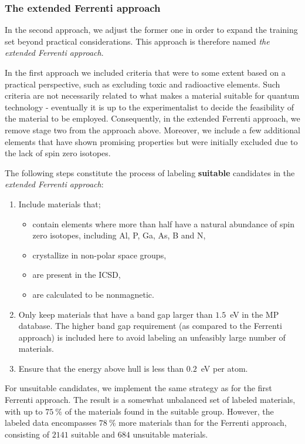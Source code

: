 \documentclass[superscriptaddress,unsortedaddress,
 amsmath,amssymb,
 aps,
]{revtex4-2}
\begin{document}
\subsubsection*{The extended Ferrenti approach}
In the second approach, we adjust the former one in order to expand the training set beyond practical considerations. This approach is therefore named \emph{the extended Ferrenti approach}. 

In the first approach we included criteria that were 
to some extent based on a practical perspective, such as excluding toxic and radioactive elements. Such criteria are not necessarily related to what makes a material suitable for quantum technology - eventually it is up to the experimentalist to decide the feasibility of the material to be employed. 
Consequently, in the extended Ferrenti approach, we remove stage two from the approach above. Moreover, we include a few additional elements that have shown promising properties but were initially excluded due to the lack of spin zero isotopes. 

The following steps constitute the process of labeling \textbf{suitable} candidates in the \emph{extended Ferrenti approach}:
\begin{enumerate}
    \item Include materials that; 
    \begin{itemize}
        \item contain elements where more than half have a natural abundance of spin zero isotopes, including Al, P, Ga, As, B and N, 
        \item crystallize in non-polar space groups,
        \item are present in the ICSD,
        \item are calculated to be nonmagnetic. 
    \end{itemize}
    \item Only keep materials that have a band gap larger than $1.5$~eV in the MP database. The higher band gap requirement (as compared to the Ferrenti approach) is included here %
    to avoid labeling an unfeasibly large number of materials. 
    \item Ensure that the energy above hull is less than $0.2$~eV per atom. 
\end{enumerate}

For unsuitable candidates, we implement the same strategy as for the first Ferrenti approach. The result is a somewhat unbalanced set of labeled materials, with up to $75 \ \%$ of the materials found in the suitable group. However, the labeled data encompasses $78 \ \%$ more materials than for the Ferrenti approach,  consisting of $2141$ suitable and $684$ unsuitable materials.
\end{document}
